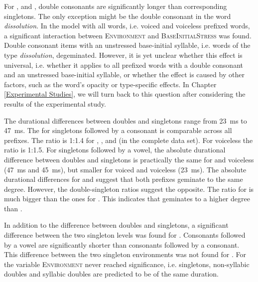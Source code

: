 For ,  and , double consonants are significantly longer than corresponding singletons. The only exception might be the double consonant in the word \textit{dissolution}. In the model with all words, i.e. voiced and voiceless prefixed words, a significant interaction between \textsc{Environment} and \textsc{BaseInitialStress} was found. Double consonant items with an unstressed base-initial syllable, i.e. words of the type \textit{dissolution}, degeminated. However, it is yet unclear whether this effect is universal, i.e. whether it applies to all prefixed words with a double consonant and an unstressed base-initial syllable,  or whether the effect is caused by other factors, such as the word's opacity or type-specific effects. In Chapter \ref{Experimental Studies}, we will turn back to this question after considering the results of the experimental study.

The durational differences between doubles and singletons range from 23~ms to 47~ms.  The   for singletons followed by a consonant is comparable across all prefixes. The ratio is 1:1.4 for , , and  (in the complete data set). For voiceless  the ratio is 1:1.5.
For singletons followed by a vowel, the absolute durational difference between doubles and singletons is practically the same for  and voiceless  (47~ms and 45~ms), but smaller for voiced and voiceless  (23~ms). The absolute durational differences for  and  suggest that both prefixes geminate to the same degree. However, the double-singleton ratios suggest the opposite. The ratio for  is much bigger than the ones for . This indicates that  geminates to a higher degree than .


In addition to the difference between doubles and singletons, a significant difference between the two singleton levels was found for . Consonants followed by a vowel are significantly shorter than consonants followed by a consonant. This difference between the two singleton environments was not found for . For  the variable \textsc{Environment} never reached significance, i.e. singletons, non-syllabic doubles and syllabic doubles are predicted to be of the same duration.

